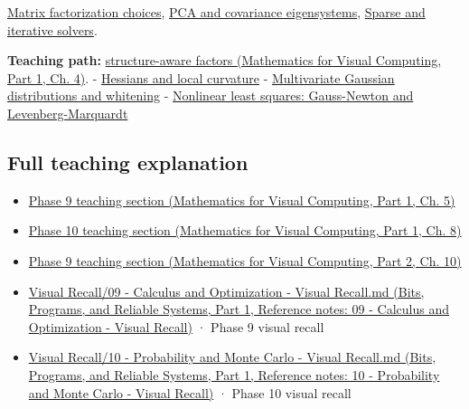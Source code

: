 \hypertarget{appendix-50d2ea3c9b26-used-by}{}

\hyperref[appendix-221a483bec2d]{Matrix factorization choices}, \hyperref[appendix-ad175ef3c5bf]{PCA and covariance eigensystems}, \hyperref[appendix-67c87a3d9e94]{Sparse and iterative solvers}.

\textbf{Teaching path:} \href{../02-Mathematics-for-Visual-Computing-P01/main.pdf\#nameddest=01-foundations-i-ch020-structure-makes-a-decomposition-a-better-tool-than-generic-elimination}{structure-aware factors (Mathematics for Visual Computing, Part 1, Ch. 4)}. - \hyperref[appendix-6ac071f8b50c]{Hessians and local curvature} - \hyperref[appendix-12bbe185dbe5]{Multivariate Gaussian distributions and whitening} - \hyperref[appendix-2c2df8345991]{Nonlinear least squares: Gauss-Newton and Levenberg-Marquardt}

\subsection{Full teaching explanation}\label{appendix-50d2ea3c9b26-full-teaching-explanation}

\hypertarget{appendix-50d2ea3c9b26-full-teaching-explanation}{}

\begin{itemize}
\tightlist
\item
  \href{../02-Mathematics-for-Visual-Computing-P01/main.pdf\#nameddest=02-foundations-ii-ch021-jacobians-curvature-and-local-approximation}{Phase 9 teaching section (Mathematics for Visual Computing, Part 1, Ch. 5)}
\item
  \href{../02-Mathematics-for-Visual-Computing-P01/main.pdf\#nameddest=02-foundations-ii-ch024-waiting-times-event-counts-and-covariance-geometry}{Phase 10 teaching section (Mathematics for Visual Computing, Part 1, Ch. 8)}
\item
  \href{../02-Mathematics-for-Visual-Computing-P02/main.pdf\#nameddest=02-foundations-ii-ch026-optimization-and-inverse-problems}{Phase 9 teaching section (Mathematics for Visual Computing, Part 2, Ch. 10)}
\item
  \href{../01-Bits-Programs-and-Reliable-Systems-P01/main.pdf\#nameddest=appendix-adf48f5dc5c1}{Visual Recall/09 - Calculus and Optimization - Visual Recall.md (Bits, Programs, and Reliable Systems, Part 1, Reference notes: 09 - Calculus and Optimization - Visual Recall)} · Phase 9 visual recall
\item
  \href{../01-Bits-Programs-and-Reliable-Systems-P01/main.pdf\#nameddest=appendix-cb5af353ef77}{Visual Recall/10 - Probability and Monte Carlo - Visual Recall.md (Bits, Programs, and Reliable Systems, Part 1, Reference notes: 10 - Probability and Monte Carlo - Visual Recall)} · Phase 10 visual recall
\end{itemize}
